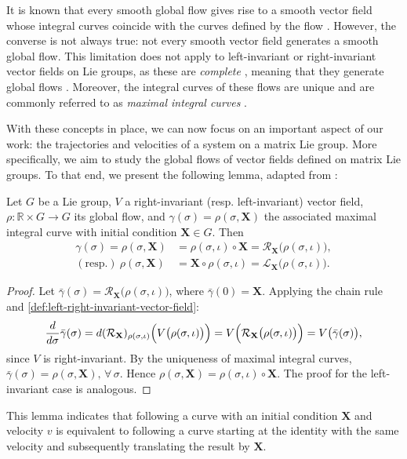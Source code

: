 It is known that every smooth global flow gives rise to a smooth vector field whose integral curves coincide with the curves defined by the flow \citep[p. 211]{Lee2012}. However, the converse is not always true: not every smooth vector field generates a smooth global flow. This limitation does not apply to left-invariant or right-invariant vector fields on Lie groups, as these are \emph{complete} \citep[p. 570]{Gallier2020}, meaning that they generate global flows \citep[p. 215]{Lee2012}. Moreover, the integral curves of these flows are unique \citep[p. 18]{Duistermaat2012} and are commonly referred to as \emph{maximal integral curves} \citep[p. 570]{Gallier2020}.

With these concepts in place, we can now focus on an important aspect of our work: the trajectories and velocities of a system on a matrix Lie group. More specifically, we aim to study the global flows of vector fields defined on matrix Lie groups. To that end, we present the following lemma, adapted from \citet[p. 570]{Gallier2020}:
\begin{lemma}\label{lemma:lie-group-flow}
    Let $G$ be a Lie group, $V$ a right-invariant (resp. left-invariant) vector field, $\rho:\mathbb{R}\times G\to G$ its global flow, and $\gamma(\sigma)=\rho(\sigma, \mathbf{X})$ the associated maximal integral curve with initial condition $\mathbf{X}\in G$. Then
    \begin{align*}
        \gamma(\sigma) = \rho(\sigma, \mathbf{X}) &=  \rho(\sigma, \iota)\circ\mathbf{X} = \mathcal{R}_\mathbf{X}\bigl(\rho(\sigma, \iota)\bigr),\\
        (\text{resp.})\ \rho(\sigma, \mathbf{X}) &=  \mathbf{X}\circ\rho(\sigma, \iota) = \mathcal{L}_\mathbf{X}\bigl(\rho(\sigma, \iota)\bigr).
    \end{align*}
\end{lemma}
\begin{proof}
    Let $\bar{\gamma}(\sigma) = \mathcal{R}_\mathbf{X}\bigl(\rho(\sigma, \iota)\bigr)$, where $\bar{\gamma}(0) = \mathbf{X}$. Applying the chain rule and \cref{def:left-right-invariant-vector-field}:
    \begin{align}
        \frac{d}{d\sigma}\bar{\gamma}(\sigma) = d(\mathcal{R}_{\mathbf{X}})_{\rho(\sigma, \iota)}\Bigl(V\bigl(\rho(\sigma, \iota)\bigr)\Bigr) = V\Bigl(\mathcal{R}_{\mathbf{X}}\bigl(\rho(\sigma, \iota)\bigr)\Bigr) = V\bigl(\bar{\gamma}(\sigma)\bigr),
    \end{align}
    since $V$ is right-invariant. By the uniqueness of maximal integral curves, $\bar{\gamma}(\sigma) = \rho(\sigma, \mathbf{X}),\,\forall\, \sigma$. Hence $\rho(\sigma, \mathbf{X}) = \rho(\sigma, \iota)\circ\mathbf{X}$. The proof for the left-invariant case is analogous.
\end{proof}
This lemma indicates that following a curve with an initial condition $\mathbf{X}$ and velocity $v$ is equivalent to following a curve starting at the identity with the same velocity and subsequently translating the result by $\mathbf{X}$.

